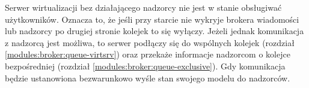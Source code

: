 \documentclass[../opis-rozwiazania.tex]{subfiles}
\begin{document}
Serwer wirtualizacji bez działającego nadzorcy nie jest w stanie obsługiwać użytkowników.
Oznacza to, że jeśli przy starcie nie wykryje brokera wiadomości
lub nadzorcy po drugiej stronie kolejek \parencite{rabbit-ack} to się wyłączy.
Jeżeli jednak komunikacja z nadzorcą jest możliwa, to serwer podłączy się do wspólnych kolejek (rozdział \ref{modules:broker:queue-virtsrv})
oraz przekaże informacje nadzorcom o kolejce bezpośredniej (rozdział \ref{modules:broker:queue-exclusive}).
Gdy komunikacja będzie ustanowiona bezwarunkowo wyśle stan swojego modelu do nadzorców.
\end{document}
